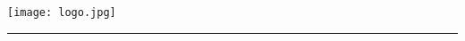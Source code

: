 \documentclass{article}
\begin{document}
\vspace*{\dimexpr-\headsep-\headheight-1pt}

\texttt{[image: logo.jpg]}

\rule{\linewidth}{1pt}

\bigskip



\newcommand{\PaperTitle}{Paper's Title\xspace}

\newcommand{\AuthorOne}{Author \#1\xspace}
\newcommand{\AuthorTwo}{Author \#2\xspace}
\newcommand{\AuthorThree}{Author \#3\xspace}
\newcommand{\AuthorFour}{Author \#4\xspace}

\newcommand{\Institution}{Institution of the Authors\xspace}
\newcommand{\InstitutionAddress}{Institution Address\xspace}
\newcommand{\City}{City\xspace}
\newcommand{\Country}{Country\xspace}

\newcommand{\EditorInChief}{Name of Editor in Chief\xspace}

\newcommand{\Journal}{Name of the Journal\xspace}

\newcommand{\Contribution}{X\xspace}
\newcommand{\Problem}{Y\xspace}
\newcommand{\Solution}{Z\xspace}
\newcommand{\Evaluation}{D\xspace}
\newcommand{\NoveltyClaim}{E\xspace}

\newcommand{\ContributionOne}{Contribution A.\xspace}
\newcommand{\ContributionTwo}{Contribution B.\xspace}
\newcommand{\ContributionThree}{Contribution C.\xspace}
\newcommand{\ContributionFour}{Contribution D.\xspace}

\newcommand{\EditorOne}{Editor \#1\xspace}
\newcommand{\EditorOneExpertise}{A\xspace}

\newcommand{\EditorTwo}{Editor \#2\xspace}
\newcommand{\EditorTwoExpertise}{B\xspace}

\newcommand{\EditorThree}{Editor \#3\xspace}
\newcommand{\EditorThreeExpertise}{C\xspace}

\end{document}
